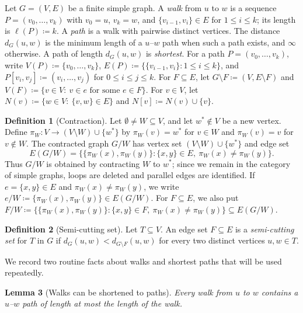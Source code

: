 \documentclass[11pt,a4paper]{amsart}
\theoremstyle{definition}
\newtheorem{definition}{Definition}[section]
\theoremstyle{plain}
\newtheorem{lemma}[definition]{Lemma}
\newcommand{\len}[1]{\ell(#1)}
\newcommand{\dist}[3]{d_{#1}(#2,#3)}
\begin{document}
Let $G=(V,E)$ be a finite simple graph. A \emph{walk} from $u$ to $w$ is a sequence $P=(v_0,\dots,v_k)$ with $v_0=u$, $v_k=w$, and $\{v_{i-1},v_i\}\in E$ for $1\le i\le k$; its length is $\len{P}\coloneqq k$. A \emph{path} is a walk with pairwise distinct vertices. The distance $\dist{G}{u}{w}$ is the minimum length of a $u$--$w$ path when such a path exists, and $\infty$ otherwise. A path of length $\dist{G}{u}{w}$ is \emph{shortest}. For a path $P=(v_0,\dots,v_k)$, write $V(P)\coloneqq \{v_0,\dots,v_k\}$, $E(P)\coloneqq \bigl\{\{v_{i-1},v_i\}: 1\le i\le k\bigr\}$, and $P[v_i,v_j]\coloneqq (v_i,\dots,v_j)$ for $0\le i\le j\le k$. For $F\subseteq E$, let $G\setminus F\coloneqq (V,E\setminus F)$ and $V(F)\coloneqq \{v\in V:\ v\in e \text{ for some } e\in F\}$. For $v\in V$, let $N(v)\coloneqq \{w\in V:\ \{v,w\}\in E\}$ and $N[v]\coloneqq N(v)\cup\{v\}$.

\begin{definition}[Contraction]\label{def:contraction}
Let $\emptyset\neq W\subseteq V$, and let $w^\ast\notin V$ be a new vertex. Define $\pi_W\colon V\to (V\setminus W)\cup\{w^\ast\}$ by $\pi_W(v)=w^\ast$ for $v\in W$ and $\pi_W(v)=v$ for $v\notin W$. The contracted graph $G/W$ has vertex set $(V\setminus W)\cup\{w^\ast\}$ and edge set
\[
E(G/W)=\bigl\{\{\pi_W(x),\pi_W(y)\}: \{x,y\}\in E,\ \pi_W(x)\neq \pi_W(y)\bigr\}.
\]
Thus $G/W$ is obtained by contracting $W$ to $w^\ast$; since we remain in the category of simple graphs, loops are deleted and parallel edges are identified. If $e=\{x,y\}\in E$ and $\pi_W(x)\neq \pi_W(y)$, we write $e/W\coloneqq \{\pi_W(x),\pi_W(y)\}\in E(G/W)$. For $F\subseteq E$, we also put $F/W\coloneqq \bigl\{\{\pi_W(x),\pi_W(y)\}: \{x,y\}\in F,\ \pi_W(x)\neq \pi_W(y)\bigr\}\subseteq E(G/W)$.
\end{definition}

\begin{definition}[Semi-cutting set]\label{def:semi-cut}
Let $T\subseteq V$. An edge set $F\subseteq E$ is a \emph{semi-cutting set} for $T$ in $G$ if $\dist{G}{u}{w}<\dist{G\setminus F}{u}{w}$ for every two distinct vertices $u,w\in T$.
\end{definition}

\noindent We record two routine facts about walks and shortest paths that will be used repeatedly.

\begin{lemma}[Walks can be shortened to paths]\label{lem:walk-to-path}
Every walk from $u$ to $w$ contains a $u$--$w$ path of length at most the length of the walk.
\end{lemma}
\end{document}
